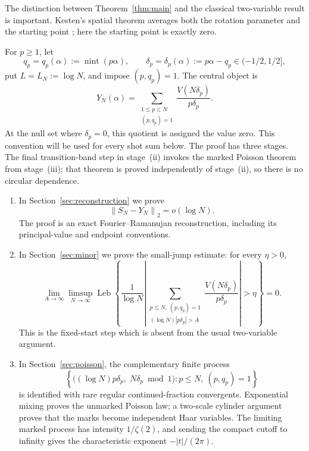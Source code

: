 \documentclass[11pt]{article}
\numberwithin{equation}{section}
\theoremstyle{definition}
\newcommand{\1}{\mathbf 1}
\newcommand{\nint}{\operatorname{nint}}
\newcommand{\Leb}{\operatorname{Leb}}
\newcommand{\norm}[1]{\left\lVert#1\right\rVert}
\begin{document}
The distinction between Theorem~\ref{thm:main} and the classical
two-variable result is important.  Kesten's spatial theorem averages both
the rotation parameter and the starting point
\cite{Kesten1960,Kesten1962}; here the starting point is exactly zero.

For \(p\ge1\), let
\[
 q_p=q_p(\alpha):=\nint(p\alpha),\qquad
 \delta_p=\delta_p(\alpha):=p\alpha-q_p\in(-1/2,1/2],
\]
put \(L=L_N:=\log N\), and impose \((p,q_p)=1\).  The central object is
\begin{equation}\label{eq:defY}
 Y_N(\alpha)=
 \sum_{\substack{1\le p\le N\\(p,q_p)=1}}
 \frac{V(N\delta_p)}{p\delta_p}.
\end{equation}
At the null set where \(\delta_p=0\), this quotient is assigned the value
zero.  This convention will be used for every shot sum below.
The proof has three stages.  The final transition-band step in
stage~(ii) invokes the marked Poisson theorem from stage~(iii); that
theorem is proved independently of stage~(ii), so there is no circular
dependence.

\begin{enumerate}[label=(\roman*)]
\item In Section~\ref{sec:reconstruction} we prove
\begin{equation}\label{eq:outline-reconstruction}
 \norm{S_N-Y_N}_2=o(\log N).
\end{equation}
The proof is an exact Fourier--Ramanujan reconstruction, including its
principal-value and endpoint conventions.

\item In Section~\ref{sec:minor} we prove the small-jump estimate: for
every \(\eta>0\),
\begin{equation}\label{eq:outline-minor}
 \lim_{A\to\infty}\limsup_{N\to\infty}
 \Leb\left\{
 \frac1{\log N}\left|
 \sum_{\substack{p\le N,\ (p,q_p)=1\\
       (\log N)|p\delta_p|>A}}
 \frac{V(N\delta_p)}{p\delta_p}\right|>\eta\right\}=0.
\end{equation}
This is the fixed-start step which is absent from the usual
two-variable argument.

\item In Section~\ref{sec:poisson}, the complementary finite process
\[
 \left\{\big((\log N)p\delta_p,\;N\delta_p\bmod 1\big):
 p\le N,\ (p,q_p)=1\right\}
\]
is identified with rare regular continued-fraction convergents.  Exponential
mixing proves the unmarked Poisson law; a two-scale cylinder argument proves
that the marks become independent Haar variables.  The limiting marked
process has intensity \(1/\zeta(2)\), and sending the compact cutoff to infinity gives
the characteristic exponent \(-|t|/(2\pi)\).
\end{enumerate}
\end{document}

